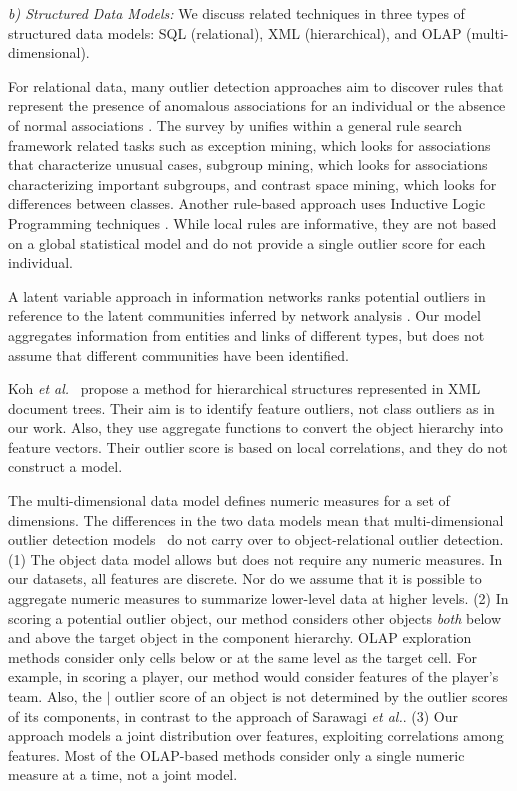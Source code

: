 \documentclass[conference]{IEEEtran}
\begin{document}
\textit{b) Structured Data Models:} We discuss related techniques in three types of structured data models: SQL (relational), XML (hierarchical), and OLAP (multi-dimensional). 

For relational data, many outlier detection approaches aim to discover rules that represent the presence of anomalous associations for an individual or the absence of normal associations \cite{Maervoet2012,Gao2010}. The survey by \cite{Novak2009} unifies within a general rule search framework related tasks such as exception mining, which looks for associations that characterize unusual cases, subgroup mining, which looks for associations  characterizing important subgroups, and contrast space mining, which looks for differences between classes. Another rule-based approach uses Inductive Logic Programming techniques \cite{Angiulli2007}.
While local rules are informative, they are not based on a global statistical model and do not provide a single outlier score for each individual. 

A latent variable approach in information networks ranks potential outliers in reference to the latent communities inferred by network analysis \cite{Gao2010}. Our model aggregates information from entities and links of different types, but does not assume that different communities have been identified. 


Koh {\em et al.}~\cite{Koh2008} propose a method for hierarchical structures represented in XML document trees. Their aim is to identify feature outliers, not class outliers as in our work. Also, they use aggregate functions to convert the object hierarchy into feature vectors. Their outlier score is based on local correlations, and they do not construct a model.


The multi-dimensional data model defines numeric measures for a set of dimensions. 
The differences in the two data models mean that multi-dimensional outlier detection models~\cite{Sarawagi1998} do not carry over to object-relational outlier detection. (1) The object data model allows but does not require any numeric measures. In our datasets, all features are discrete. Nor do we assume that it is possible to aggregate numeric measures to summarize lower-level data at higher levels.  
(2) In scoring a potential outlier object, our method considers other objects {\em both} below and above the target object in the component hierarchy. OLAP exploration methods consider only cells below or at the same level as the target cell. For example, in scoring a player, our method would consider features of the player's team.  
Also, the $\mid$ outlier score of an object is not determined by the outlier scores of its components, in contrast to the approach of Sarawagi {\em et al.}.
(3) Our approach models a joint distribution over features, exploiting correlations among features. Most of the OLAP-based methods consider only a single numeric measure at a time, not a joint model.  
\end{document}
